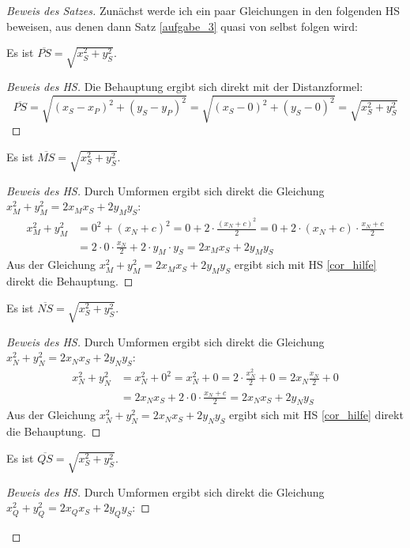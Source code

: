 \begin{proof}[Beweis des Satzes]
    Zunächst werde ich ein paar Gleichungen in den folgenden HS beweisen, aus denen dann Satz \ref{aufgabe_3} quasi 
    von selbst folgen wird:
    \begin{lem}\label{no_P}
        Es ist $\overline{PS}=\sqrt{x_S^2+y_S^2}$.
    \end{lem}
    \begin{proof}[Beweis des HS]
        Die Behauptung ergibt sich direkt mit der Distanzformel:
        \[
        \overline{PS}=\sqrt{(x_S-x_P)^2+(y_S-y_P)^2}=\sqrt{(x_S-0)^2+(y_S-0)^2}=\sqrt{x_S^2+y_S^2}    
        \]
    \end{proof}
    \begin{lem}\label{no_M}
        Es ist $\overline{MS}=\sqrt{x_S^2+y_S^2}$.
    \end{lem}
    \begin{proof}[Beweis des HS]
        Durch Umformen ergibt sich direkt die Gleichung $x_M^2+y_M^2=2x_Mx_S+2y_My_S$:
        \begin{align*}
            x_M^2+y_M^2&=0^2+(x_N+c)^2=0+2\cdot \frac{(x_N+c)^2}{2}=0+2\cdot (x_N+c)\cdot\frac{x_N+c}{2}\\
            &=2\cdot 0\cdot \frac{x_N}{2}+2\cdot y_M\cdot y_S=2x_Mx_S+2y_My_S
        \end{align*}
        Aus der Gleichung $x_M^2+y_M^2=2x_Mx_S+2y_My_S$ ergibt sich mit HS \ref{cor_hilfe} direkt die Behauptung.
    \end{proof}
    \begin{lem}\label{no_N}
        Es ist $\overline{NS}=\sqrt{x_S^2+y_S^2}$.
    \end{lem}
    \begin{proof}[Beweis des HS]
        Durch Umformen ergibt sich direkt die Gleichung $x_N^2+y_N^2=2x_Nx_S+2y_Ny_S$:
        \begin{align*}
            x_N^2+y_N^2&=x_N^2+0^2=x_N^2+0=2\cdot \frac{x_N^2}{2}+0=2x_N\frac{x_N}{2}+0\\
            &=2x_Nx_S+2\cdot 0\cdot \frac{x_N+c}{2}=2x_Nx_S+2y_Ny_S
        \end{align*}
        Aus der Gleichung $x_N^2+y_N^2=2x_Nx_S+2y_Ny_S$ ergibt sich mit HS \ref{cor_hilfe} direkt die Behauptung.
    \end{proof}
    \begin{lem}\label{no_Q}
        Es ist $\overline{QS}=\sqrt{x_S^2+y_S^2}$.
    \end{lem}
    \begin{proof}[Beweis des HS]
        Durch Umformen ergibt sich direkt die Gleichung $x_Q^2+y_Q^2=2x_Qx_S+2y_Qy_S$:

\end{proof}
\end{proof}
